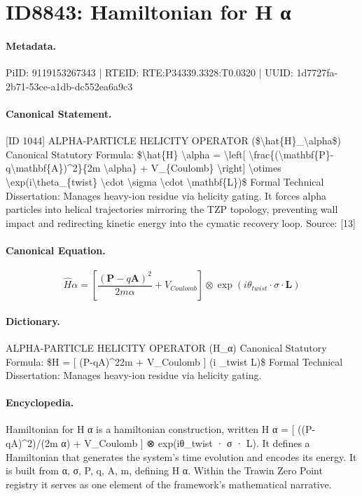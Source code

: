 \section*{ID8843: Hamiltonian for H α}
\paragraph{Metadata.}
PiID: 9119153267343 | RTEID: RTE:P34339.3328:T0.0320 | UUID: 1d7727fa-2b71-53ce-a1db-dc552ea6a9c3

\paragraph{Canonical Statement.}
[ID 1044] ALPHA-PARTICLE HELICITY OPERATOR (\$\textbackslash{}hat\{H\}\_\textbackslash{}alpha\$) Canonical Statutory Formula: \$\textbackslash{}hat\{H\} \textbackslash{}alpha = \textbackslash{}left[ \textbackslash{}frac\{(\textbackslash{}mathbf\{P\}-q\textbackslash{}mathbf\{A\})\textasciicircum{}2\}\{2m \textbackslash{}alpha\} + V\_\{Coulomb\} \textbackslash{}right] \textbackslash{}otimes \textbackslash{}exp(i\textbackslash{}theta\_\{twist\} \textbackslash{}cdot \textbackslash{}sigma \textbackslash{}cdot \textbackslash{}mathbf\{L\})\$ Formal Technical Dissertation: Manages heavy-ion residue via helicity gating. It forces alpha particles into helical trajectories mirroring the TZP topology, preventing wall impact and redirecting kinetic energy into the cymatic recovery loop. Source: [13]

\paragraph{Canonical Equation.}
\[
\hat{H} \alpha = \left[ \frac{(\mathbf{P}-q\mathbf{A})^2}{2m \alpha} + V_{Coulomb} \right] \otimes \exp(i\theta_{twist} \cdot \sigma \cdot \mathbf{L})
\]

\paragraph{Dictionary.}
ALPHA-PARTICLE HELICITY OPERATOR (H\_α) Canonical Statutory Formula: \$H = [ (P-qA)\textasciicircum{}22m + V\_Coulomb ] (i \_twist L)\$ Formal Technical Dissertation: Manages heavy-ion residue via helicity gating.

\paragraph{Encyclopedia.}
Hamiltonian for H α is a hamiltonian construction, written H α = [ ((P-qA)\textasciicircum{}2)/(2m α) + V\_Coulomb ] ⊗ exp(iθ\_twist · σ · L). It defines a Hamiltonian that generates the system's time evolution and encodes its energy. It is built from α, σ, P, q, A, m, defining H α. Within the Trawin Zero Point registry it serves as one element of the framework's mathematical narrative.
